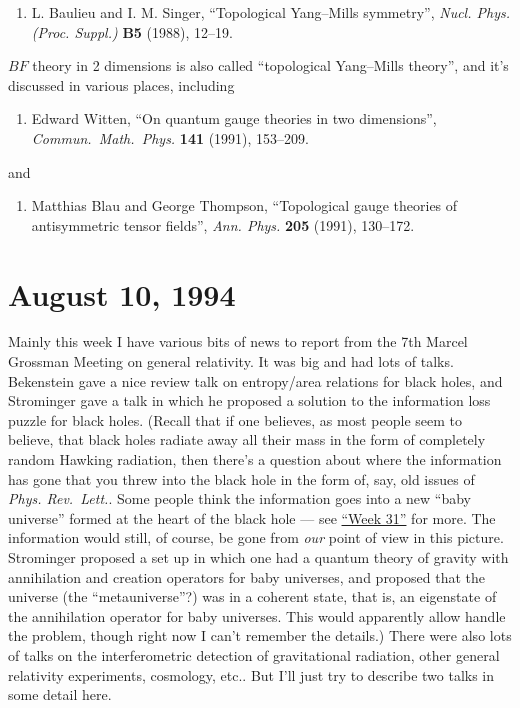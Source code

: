\documentclass[12pt]{article}
\def\tightlist{}
\begin{document}
\begin{enumerate}
\def\labelenumi{\arabic{enumi})}
\setcounter{enumi}{3}
\tightlist
\item
  L. Baulieu and I. M. Singer, ``Topological Yang--Mills symmetry'',
  \emph{Nucl. Phys. (Proc. Suppl.)} \textbf{B5} (1988), 12--19.
\end{enumerate}
\noindent
\(BF\) theory in 2 dimensions is also called ``topological Yang--Mills
theory'', and it's discussed in various places, including

\begin{enumerate}
\def\labelenumi{\arabic{enumi})}
\setcounter{enumi}{4}
\tightlist
\item
   Edward Witten, ``On quantum gauge theories in two dimensions'',
  \emph{Commun.\ Math.\ Phys.} \textbf{141} (1991), 153--209.
\end{enumerate}
\noindent
and

\begin{enumerate}
\def\labelenumi{\arabic{enumi})}
\setcounter{enumi}{5}
\tightlist
\item
 Matthias Blau and George Thompson,  ``Topological gauge theories of antisymmetric tensor fields'', \emph{Ann. Phys.} \textbf{205} (1991), 130--172.
\end{enumerate}



\hypertarget{week37}{%
\section{August 10, 1994}\label{week37}}

Mainly this week I have various bits of news to report from the 7th
Marcel Grossman Meeting on general relativity. It was big and had lots
of talks. Bekenstein gave a nice review talk on entropy/area relations
for black holes, and Strominger gave a talk in which he proposed a
solution to the information loss puzzle for black holes. (Recall that if
one believes, as most people seem to believe, that black holes radiate
away all their mass in the form of completely random Hawking radiation,
then there's a question about where the information has gone that you
threw into the black hole in the form of, say, old issues of \emph{Phys.
Rev.~Lett.}. Some people think the information goes into a new ``baby
universe'' formed at the heart of the black hole --- see
\protect\hyperlink{week31}{``Week 31''} for more. The information would
still, of course, be gone from \emph{our} point of view in this picture.
Strominger proposed a set up in which one had a quantum theory of
gravity with annihilation and creation operators for baby universes, and
proposed that the universe (the ``metauniverse''?) was in a coherent
state, that is, an eigenstate of the annihilation operator for baby
universes. This would apparently allow handle the problem, though right
now I can't remember the details.) There were also lots of talks on the
interferometric detection of gravitational radiation, other general
relativity experiments, cosmology, etc.. But I'll just try to describe
two talks in some detail here.
\end{document}

